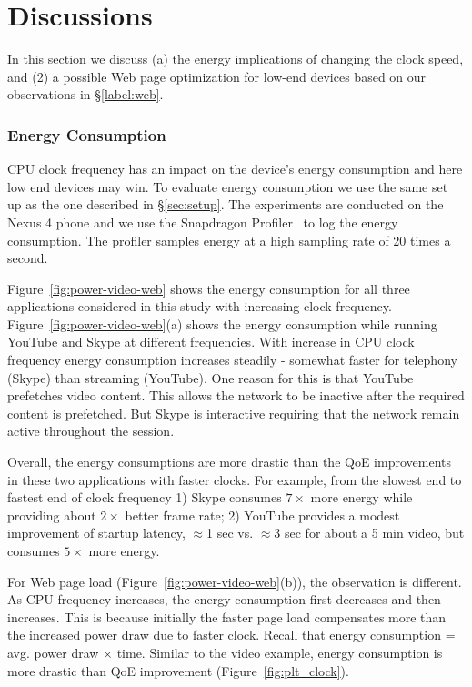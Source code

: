 \section{Discussions}
\label{sec:energy}

In this section we discuss (a) the energy implications of changing the clock speed, and (2) a possible Web page optimization for low-end devices based on our observations in \S\ref{label:web}.

\subsubsection{Energy Consumption}
CPU clock frequency has an impact on the device's energy consumption and here low end devices may win. To evaluate 
energy consumption we use the same set up as the one described in \S\ref{sec:setup}. The experiments are conducted on the Nexus 4 phone and we use the Snapdragon Profiler~\cite{qualsnap} to log the energy consumption. The profiler samples energy at a high sampling rate of 20 times a second. %

Figure~\ref{fig:power-video-web}
shows the energy consumption for all three applications
considered in this study with increasing 
clock frequency. Figure~\ref{fig:power-video-web}(a) shows the energy consumption while running YouTube and Skype at different frequencies. With increase in CPU clock frequency energy consumption increases steadily - somewhat faster for telephony (Skype) than streaming (YouTube). One reason for this is that YouTube prefetches video content. This allows the network to be inactive after the required content is prefetched. But Skype is interactive requiring that the network remain active throughout the session. 

Overall, the energy consumptions are more
drastic than the QoE improvements in these two applications
with faster clocks. For example, from the slowest end to fastest
end of clock frequency 1) Skype consumes $7\times$ more 
energy  while providing about $2\times$ better
frame rate; 2)  YouTube provides a modest
improvement of startup latency, $\approx$1 sec vs. 
$\approx$3 sec for about a 5 min video, but consumes
$5\times$ more energy. 

For Web page load (Figure~\ref{fig:power-video-web}(b)), 
the observation is different. As CPU frequency increases, the 
energy consumption first decreases and then increases. This 
is because initially the faster page load compensates
more than the increased power draw due to faster 
clock. Recall that 
energy consumption = avg. power draw $\times$ time. Similar to the video example, energy consumption is more drastic than QoE improvement (Figure~\ref{fig:plt_clock}). %

